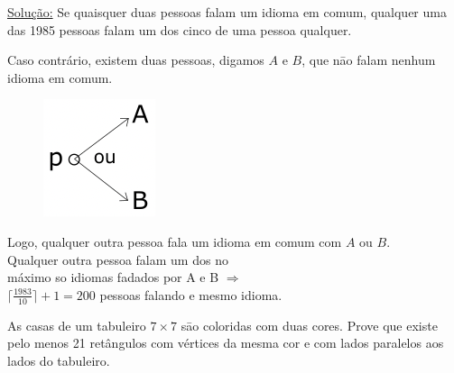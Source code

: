 \documentclass[a4paper,12pt]{article}
\theoremstyle{plain} %
\theoremstyle{definition} %
\theoremstyle{remark} %
\newcommand*\circled[1]{\tikz[baseline=(char.base)]{
		\node[shape=circle,draw,inner sep=2pt] (char) {#1};}}%
\begin{document}
	\begin{framed}
		\underline{Solu\c{c}\~ao:} Se quaisquer duas pessoas falam um idioma em comum, qualquer uma das 1985 pessoas falam um dos cinco de uma pessoa qualquer.
		
		Caso contr\'ario, existem duas pessoas, digamos $A$ e $B$, que n\=ao falam nenhum idioma em comum.
		
		\begin{figure}
			\includegraphics[width=0.9\linewidth]{1 page 8.png}
		\end{figure} Logo, qualquer outra pessoa fala um idioma em comum com $A$ ou $B$. \\
		Qualquer outra pessoa falam um dos no \\
		m\'aximo so idiomas fadados por 
		A e B $\Rightarrow$ \\
		$\lceil \frac{1983}{10}\rceil+1=200$ pessoas falando e mesmo idioma.
	\end{framed}
	
	\circled{3} As casas de um tabuleiro $7\times 7$ s\=ao coloridas com duas cores. Prove que existe pelo menos 21 ret\^angulos com v\'ertices da mesma cor e com lados paralelos aos lados do tabuleiro.
	
\end{document}
